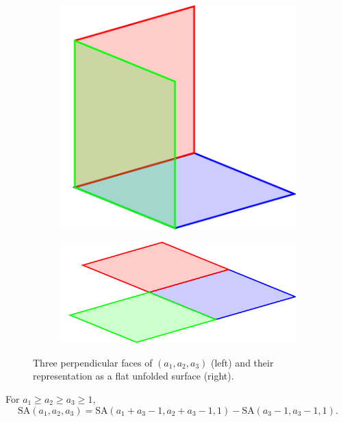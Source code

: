 \begin{figure}[]
\centering
\begin{subfigure}[b]{0.35\textwidth}
	\includegraphics[width=\textwidth]{figures/3/manifold_a.pdf}
	\label{fig:manifold_a}
\end{subfigure} \hfill%
\begin{subfigure}[b]{0.55\textwidth}
	\includegraphics[width=\textwidth]{figures/3/manifold_flat.pdf}
	\label{fig:manifold_b}
\end{subfigure}
\caption{Three perpendicular faces of $(a_1,a_2,a_3)$ (left) and their representation as a flat unfolded surface (right).}
\label{fig:manifold_types}
\end{figure} 

\begin{lem}
\label{lem:unfolded_cube}
For $a_1 \geq a_2 \geq a_3 \geq 1$, 
$$\text{SA}(a_1, a_2, a_3) = \text{SA}(a_1+a_3-1, a_2+a_3-1, 1) - \text{SA}(a_3-1, a_3-1, 1).$$
\end{lem}

